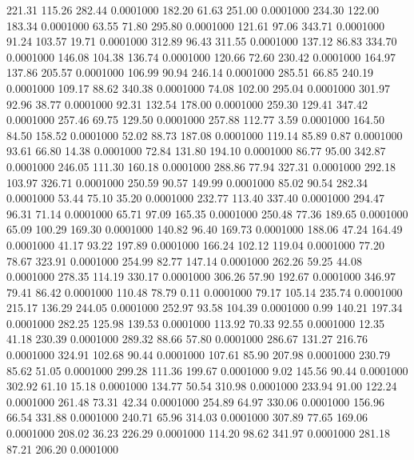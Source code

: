  221.31  115.26  282.44   0.0001000
 182.20   61.63  251.00   0.0001000
 234.30  122.00  183.34   0.0001000
  63.55   71.80  295.80   0.0001000
 121.61   97.06  343.71   0.0001000
  91.24  103.57   19.71   0.0001000
 312.89   96.43  311.55   0.0001000
 137.12   86.83  334.70   0.0001000
 146.08  104.38  136.74   0.0001000
 120.66   72.60  230.42   0.0001000
 164.97  137.86  205.57   0.0001000
 106.99   90.94  246.14   0.0001000
 285.51   66.85  240.19   0.0001000
 109.17   88.62  340.38   0.0001000
  74.08  102.00  295.04   0.0001000
 301.97   92.96   38.77   0.0001000
  92.31  132.54  178.00   0.0001000
 259.30  129.41  347.42   0.0001000
 257.46   69.75  129.50   0.0001000
 257.88  112.77    3.59   0.0001000
 164.50   84.50  158.52   0.0001000
  52.02   88.73  187.08   0.0001000
 119.14   85.89    0.87   0.0001000
  93.61   66.80   14.38   0.0001000
  72.84  131.80  194.10   0.0001000
  86.77   95.00  342.87   0.0001000
 246.05  111.30  160.18   0.0001000
 288.86   77.94  327.31   0.0001000
 292.18  103.97  326.71   0.0001000
 250.59   90.57  149.99   0.0001000
  85.02   90.54  282.34   0.0001000
  53.44   75.10   35.20   0.0001000
 232.77  113.40  337.40   0.0001000
 294.47   96.31   71.14   0.0001000
  65.71   97.09  165.35   0.0001000
 250.48   77.36  189.65   0.0001000
  65.09  100.29  169.30   0.0001000
 140.82   96.40  169.73   0.0001000
 188.06   47.24  164.49   0.0001000
  41.17   93.22  197.89   0.0001000
 166.24  102.12  119.04   0.0001000
  77.20   78.67  323.91   0.0001000
 254.99   82.77  147.14   0.0001000
 262.26   59.25   44.08   0.0001000
 278.35  114.19  330.17   0.0001000
 306.26   57.90  192.67   0.0001000
 346.97   79.41   86.42   0.0001000
 110.48   78.79    0.11   0.0001000
  79.17  105.14  235.74   0.0001000
 215.17  136.29  244.05   0.0001000
 252.97   93.58  104.39   0.0001000
   0.99  140.21  197.34   0.0001000
 282.25  125.98  139.53   0.0001000
 113.92   70.33   92.55   0.0001000
  12.35   41.18  230.39   0.0001000
 289.32   88.66   57.80   0.0001000
 286.67  131.27  216.76   0.0001000
 324.91  102.68   90.44   0.0001000
 107.61   85.90  207.98   0.0001000
 230.79   85.62   51.05   0.0001000
 299.28  111.36  199.67   0.0001000
   9.02  145.56   90.44   0.0001000
 302.92   61.10   15.18   0.0001000
 134.77   50.54  310.98   0.0001000
 233.94   91.00  122.24   0.0001000
 261.48   73.31   42.34   0.0001000
 254.89   64.97  330.06   0.0001000
 156.96   66.54  331.88   0.0001000
 240.71   65.96  314.03   0.0001000
 307.89   77.65  169.06   0.0001000
 208.02   36.23  226.29   0.0001000
 114.20   98.62  341.97   0.0001000
 281.18   87.21  206.20   0.0001000
